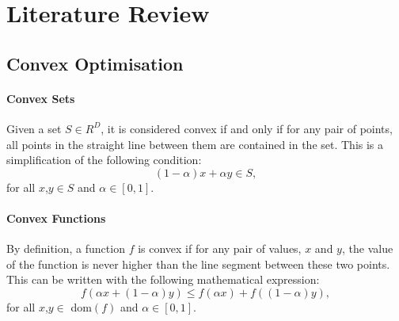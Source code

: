 \section{Literature Review}




    \subsection{Convex Optimisation}

    \paragraph{Convex Sets}
    Given a set $S\in R^D$, it is considered convex if and only if for any pair of points, all points in the straight line between them are contained in the set.
    This is a simplification of the following condition:
    \begin{equation}
        (1- \alpha)x + \alpha y \in S,
    \end{equation}
    for all $x$,$y \in S$ and $\alpha \in [0, 1]$.
    
    
    \paragraph{Convex Functions}
    By definition, a function $f$ is convex if for any pair of values, $x$ and $y$, the value of the function is never higher than the line segment between these two points. This can be written with the following mathematical expression:
    \begin{equation}
        f(\alpha x + (1-\alpha)y) \le f(\alpha x) + f((1-\alpha)y),
    \end{equation}
    for all $x$,$y \in  $ dom$(f)$ and $\alpha \in [0, 1]$.
    
